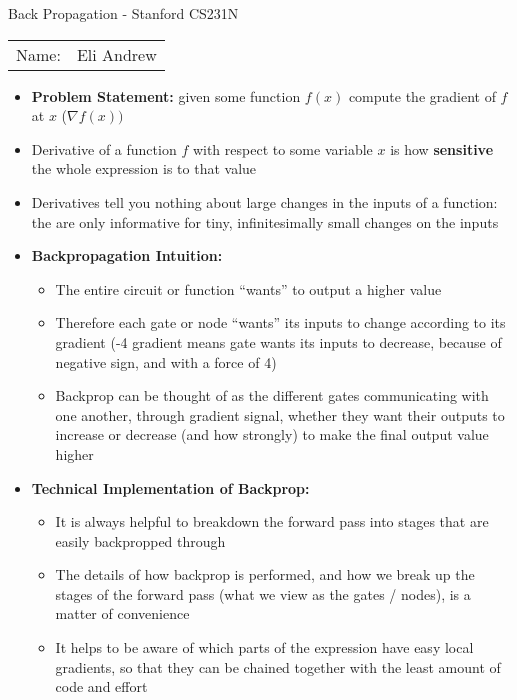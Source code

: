 \documentclass[12pt]{article}
\begin{document}
\begin{center}
{\Large Back Propagation - Stanford CS231N}

\begin{tabular}{rl}
Name: & Eli Andrew
\end{tabular}
\end{center}

  \begin{itemize}
    \item \textbf{Problem Statement:} given some function $f(x)$ compute the gradient of $f$ at $x$ ($\nabla f(x))$
    \item Derivative of a function $f$ with respect to some variable $x$ is how \textbf{sensitive} the whole expression is to that value
    \item Derivatives tell you nothing about large changes in the inputs of a function: the are only informative for tiny, infinitesimally small
    changes on the inputs
    \item \textbf{Backpropagation Intuition:}
    \begin{itemize}
      \item The entire circuit or function ``wants'' to output a higher value
      \item Therefore each gate or node ``wants'' its inputs to change according to its gradient (-4 gradient means gate wants its inputs to decrease,
      because of negative sign, and with a force of 4) 
      \item Backprop can be thought of as the different gates communicating with one another, through gradient signal, whether they want their outputs
      to increase or decrease (and how strongly) to make the final output value higher
    \end{itemize}
    \item \textbf{Technical Implementation of Backprop:}
    \begin{itemize}
      \item It is always helpful to breakdown the forward pass into stages that are easily backpropped through
      \item The details of how backprop is performed, and how we break up the stages of the forward pass (what we view as the gates / nodes),
      is a matter of convenience
      \item It helps to be aware of which parts of the expression have easy local gradients, so that they can be chained together with the least
      amount of code and effort
    \end{itemize}

\end{itemize}
\end{document}
